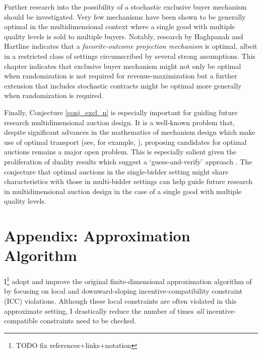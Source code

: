 Further research into the possibility of a stochastic exclusive buyer mechanism should be investigated. Very few mechanisms have been shown to be generally optimal in the multidimensional context where a single good with multiple quality levels is sold to multiple buyers. Notably, research by Haghpanah and Hartline \autocite*[Theorem 9]{haghpanah2014} indicates that a \textit{favorite-outcome projection mechanism} is optimal, albeit in a restricted class of settings circumscribed by several strong assumptions. This chapter indicates that exclusive buyer mechanism might not only be optimal when randomization is not required for revenue-maximization but a further extension that includes stochastic contracts might be optimal more generally when randomization is required.

Finally, Conjecture \ref{conj_excl_n} is especially important for guiding future research multidimensional auction design. It is a well-known problem that, despite significant advances in the mathematics of mechanism design which make use of optimal transport (see, for example, \cite{ekeland2010}), proposing candidates for optimal auctions remains a major open problem. This is especially salient given the proliferation of duality results which suggest a `guess-and-verify' approach \autocite{daskalakis2017strong,kolesnikov2022}. The conjecture that optimal auctions in the single-bidder setting might share characteristics with those in multi-bidder settings can help guide future research in multidimensional auction design in the case of a single good with multiple quality levels.




\newpage






\section{Appendix: Approximation Algorithm}\label{appendix:algo}

I\footnote{\color{red}TODO fix references+links+notation} adopt and improve the original finite-dimensional approximation algorithm of \autocite{belloni2010multidimensional} by focusing on local and downward-sloping incentive-compatibility constraint (ICC) violations. Although these local constraints are often violated in this approximate setting, I drastically reduce the number of times \textit{all} incentive-compatible constraints need to be checked.

